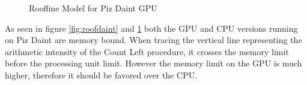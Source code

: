 \documentclass[]{article}
\begin{document}
\begin{figure}[H]
	\begin{center}
		\caption{Roofline Model for Piz Daint GPU}
		\label{fig:roofdaintGPU}
	\end{center}
\end{figure}

As seen in figure \ref{fig:roofdaint} and \ref{fig:roofdaintGPU} both the GPU and CPU versions running on Piz Daint are memory bound. When tracing the vertical line representing the arithmetic intensity of the Count Left procedure, it crosses the memory limit before the processing unit limit. However the memory limit on the GPU is much higher, therefore it should be favored over the CPU. 
\end{document}
